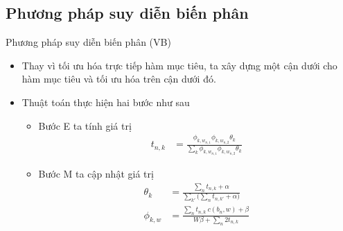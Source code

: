 \documentclass[pdf]{beamer}
\begin{document}
\subsection{Phương pháp suy diễn biến phân}
\begin{frame}{Phương pháp suy diễn biến phân (VB)}
\begin{itemize}
	\item Thay vì tối ưu hóa trực tiếp hàm mục tiêu, ta xây dựng một
	cận dưới cho hàm mục tiêu và tối ưu hóa trên cận dưới đó.
	\item Thuật toán thực hiện hai bước như sau
	\begin{itemize}
		\item Bước E ta tính giá trị
		\begin{align*}
		t_{n,k} &=  \frac{\phi_{k,w_{n,1}} \phi_{k,w_{n,2}} \theta_k}
		{\sum_k \phi_{k,w_{n,1}} \phi_{k,w_{n,2}} \theta_k}
		\end{align*}
		
		\item Bước M ta cập nhật giá trị
		\begin{align*}
		\theta_k &= \frac{\sum_n t_{n,k} + \alpha}{\sum_{k'} \big( \sum_n t_{n,k'} + \alpha \big)} \\
		\phi_{k,w} &= \frac{\sum_{n} t_{n,k} \ c(b_{n},w) + \beta}{W \beta + \sum_{n} 2t_{n,k}}
		\end{align*}
	\end{itemize}				
\end{itemize}

\end{frame}
\end{document}
